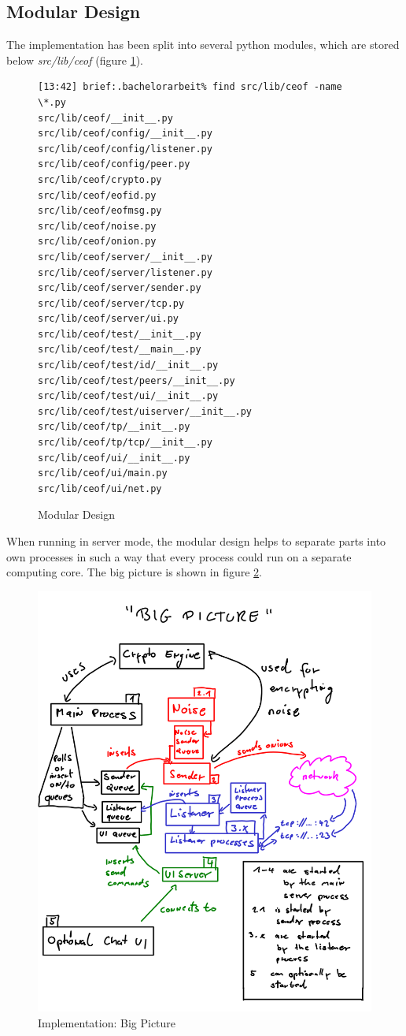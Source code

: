 \subsection{Modular Design}
The implementation has been split into several python
modules, which are stored below \textit{src/lib/ceof} 
(figure \ref{pythonmodules}).
\begin{figure}[htbp]
\caption{Modular Design}
\label{pythonmodules}
\begin{verbatim}
[13:42] brief:.bachelorarbeit% find src/lib/ceof -name \*.py
src/lib/ceof/__init__.py
src/lib/ceof/config/__init__.py
src/lib/ceof/config/listener.py
src/lib/ceof/config/peer.py
src/lib/ceof/crypto.py
src/lib/ceof/eofid.py
src/lib/ceof/eofmsg.py
src/lib/ceof/noise.py
src/lib/ceof/onion.py
src/lib/ceof/server/__init__.py
src/lib/ceof/server/listener.py
src/lib/ceof/server/sender.py
src/lib/ceof/server/tcp.py
src/lib/ceof/server/ui.py
src/lib/ceof/test/__init__.py
src/lib/ceof/test/__main__.py
src/lib/ceof/test/id/__init__.py
src/lib/ceof/test/peers/__init__.py
src/lib/ceof/test/ui/__init__.py
src/lib/ceof/test/uiserver/__init__.py
src/lib/ceof/tp/__init__.py
src/lib/ceof/tp/tcp/__init__.py
src/lib/ceof/ui/__init__.py
src/lib/ceof/ui/main.py
src/lib/ceof/ui/net.py
\end{verbatim}
\end{figure}
When running in server mode, the modular design helps
to separate parts into own processes in such a way that
every process could run on a separate computing
core. The big picture is shown in figure \ref{bigpicture}.
\begin{figure}[htbp]
\caption{Implementation: Big Picture}
\label{bigpicture}
\includegraphics[scale=0.8]{bigpicture.png}
\end{figure}
